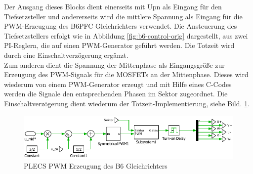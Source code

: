 			Der Ausgang dieses Blocks dient einerseits mit \gls{Upn} als Eingang für den Tiefsetzsteller und andererseits wird die mittlere Spannung als Eingang für die PWM-Erzeugung des \gls{B6PFC} Gleichrichters verwendet. Die Ansteuerung des Tiefsetzstellers erfolgt wie in Abbildung \ref{fig:b6-control-orig} dargestellt, aus zwei PI-Reglern, die auf einen PWM-Generator geführt werden. Die Totzeit wird durch eine Einschaltverzögerung ergänzt.\\
			Zum anderen dient die Spannung der Mittenphase als Eingangsgröße zur Erzeugung des PWM-Signals für die \gls{MOSFET}s an der Mittenphase. Dieses wird wiederum von einem PWM-Generator erzeugt und mit Hilfe eines C-Codes werden die Signale den entsprechenden Phasen im Sektor zugeordnet. Die Einschaltverzögerung dient wiederum der Totzeit-Implementierung, siehe Bild. \ref{fig:plecsb6controlpwmmid}.
			
		\begin{figure}
			\centering
			\includegraphics[width=0.9\linewidth]{content/Grafiken/PLECS_B6_ControlPWMmid}
			\caption{PLECS PWM Erzeugung des B6 Gleichrichters}
			\label{fig:plecsb6controlpwmmid}
		\end{figure}
		
		
			
			
